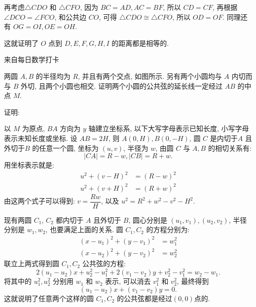 再考虑$\triangle CDO$ 和 $\triangle CFO$, 因为 $BC = AD, AC = BF$, 所以 $CD = CF$, 再根据 $\angle DCO = \angle FCO$, 和公共边 $CO$, 可得 $\triangle CDO \cong \triangle CFO$, 所以 $OD = OF$. 同理还有 $ OG = OI, OE = OH$.

这就证明了 $O$ 点到 $D,E,F,G,H,I$ 的距离都是相等的.

\newpage
\noindent 来自每日数学打卡

两圆 $A,B$ 的半径均为 $R$, 并且有两个交点, 如图所示. 另有两个小圆均与 $A$ 内切而与 $B$ 外切, 且两个小圆也相交. 证明两个小圆的公共弦的延长线一定经过 $AB$ 的中点 $M$.

\begin{figure*}[htbp]
\centering
{}
\end{figure*}

\noindent 证明: 

以 $M$ 为原点, $BA$ 方向为 $y$ 轴建立坐标系, 以下大写字母表示已知长度, 小写字母表示未知长度或坐标. 设 $AB = 2H$, 则 $A(0,H), B(0,-H)$, 圆 $C$ 是内切于$A$ 且外切于$B$ 的任意一个圆, 坐标为 $(u,v)$, 半径为 $w$, 由圆 $C$ 与 $A,B$ 的相切关系有: 
\[ |CA| = R-w, |CB| = R+w. \]
用坐标表示就是:
\begin{align*}
u^2 + (v-H)^2 &= (R-w)^2 \\
u^2 + (v+H)^2 &= (R+w)^2
\end{align*}
由这两个式子可以得到: $v = \dfrac{Rw}{H}$, 以及 $u^2 = R^2+w^2-v^2-H^2$.

现有两圆 $C_1$, $C_2$ 都内切于 $A$ 且外切于 $B$, 圆心分别是 $(u_1,v_1), (u_2,v_2)$, 半径分别是 $w_1, w_2$, 也要满足上面的关系. 圆 $C_1, C_2$ 的方程分别为:
\begin{align*}
(x-u_1)^2 + (y-v_1)^2 &= w_1^2 \\
(x-u_2)^2 + (y-v_2)^2 &= w_2^2 
\end{align*}
联立上两式得到圆 $C_1, C_2$ 公共弦的方程:
\[ 2(u_1-u_2)x + u_2^2-u_1^2 + 2(v_1-v_2)y + v_2^2-v_1^2=w_2-w_1 .\]
将其中的 $u_1^2, u_2^2$ 分别用 $w_1$ 和 $w_2$ 表示, 可以消去 $v_1^2$ 和 $v_2^2$, 最终得到
\[ (u_1-u_2)x+(v_1-v_2)y=0 .\]
这就说明了任意两个这样的圆 $C_1, C_2$ 的公共弦都是经过$(0,0)$点的.

